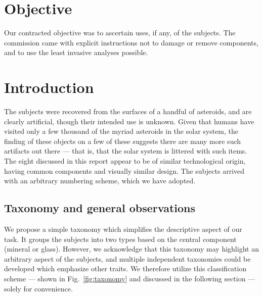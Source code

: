 \documentclass[10pt]{article}
\theoremstyle{definition}
\begin{document}
\maketitle


\section{Objective}
Our contracted objective was to ascertain uses, if any, of the subjects.
The commission came with explicit instructions not to damage or remove components, and to use the least invasive analyses possible.

\section{Introduction}
The subjects were recovered from the surfaces of a handful of asteroids, and are clearly artificial, though their intended use is unknown.
Given that humans have visited only a few thousand of the myriad asteroids in the solar system, the finding of these objects on a few of these suggests there are many more such artifacts out there --- that is, that the solar system is littered with such items.
The eight discussed in this report appear to be of similar technological origin, having common components and visually similar design.
The subjects arrived with an arbitrary numbering scheme, which we have adopted.

\subsection{Taxonomy and general observations}\label{sec:taxonomy}
We propose a simple taxonomy which simplifies the descriptive aspect of our task.
It groups the subjects into two types based on the central component (mineral or glass).
However, we acknowledge that this taxonomy may highlight an arbitrary aspect of the subjects, and multiple independent taxonomies could be developed which emphasize other traits.
We therefore utilize this classification scheme --- shown in Fig.~\ref{fig:taxonomy} and discussed in the following section --- solely for convenience.
\end{document}
